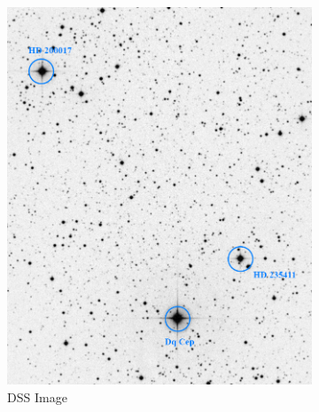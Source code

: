 \documentclass[]{article}
\begin{document}
\begin{figure}[h]
	\centering
	\begin{subfigure}[t]{.45\textwidth}
		\centering
		\includegraphics[width=\textwidth]{figs/dss_map.png}
		\caption{DSS Image\footnotemark}
	\end{subfigure}
	\qquad
	\begin{subfigure}[t]{.45\textwidth}
		\centering

\end{subfigure}
\end{figure}
\end{document}
